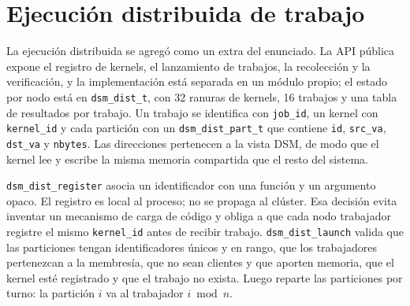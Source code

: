 \documentclass[11pt,spanish]{article}
\begin{document}
\section{Ejecución distribuida de trabajo}\label{sec:dist}

La ejecución distribuida se agregó como un extra del enunciado. La API pública expone el registro de kernels, el lanzamiento de trabajos, la recolección y la verificación, y la implementación está separada en un módulo propio; el estado por nodo está en \texttt{dsm\_dist\_t}, con 32 ranuras de kernels, 16 trabajos y una tabla de resultados por trabajo. Un trabajo se identifica con \texttt{job\_id}, un kernel con \texttt{kernel\_id} y cada partición con un \texttt{dsm\_dist\_part\_t} que contiene \texttt{id}, \texttt{src\_va}, \texttt{dst\_va} y \texttt{nbytes}. Las direcciones pertenecen a la vista DSM, de modo que el kernel lee y escribe la misma memoria compartida que el resto del sistema.

\texttt{dsm\_dist\_register} asocia un identificador con una función y un argumento opaco. El registro es local al proceso; no se propaga al clúster. Esa decisión evita inventar un mecanismo de carga de código y obliga a que cada nodo trabajador registre el mismo \texttt{kernel\_id} antes de recibir trabajo. \texttt{dsm\_dist\_launch} valida que las particiones tengan identificadores únicos y en rango, que los trabajadores pertenezcan a la membresía, que no sean clientes y que aporten memoria, que el kernel esté registrado y que el trabajo no exista. Luego reparte las particiones por turno: la partición $i$ va al trabajador $i \bmod n$.
\end{document}

